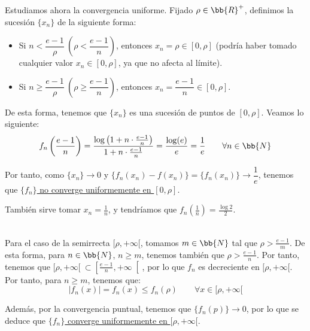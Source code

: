 \begin{ejercicio}
    Estudiamos ahora la convergencia uniforme. Fijado $\rho \in \bb{R}^+$, definimos la sucesión $\{x_n\}$ de la siguiente forma:
    \begin{itemize}
        \item Si $n < \dfrac{e-1}{\rho}~\left(\rho < \dfrac{e-1}{n}\right)$, entonces $x_n = \rho \in [0,\rho]$ (podría haber tomado cualquier valor $x_n\in [0,\rho]$, ya que no afecta al límite).
        \item Si $n \geq \dfrac{e-1}{\rho}~\left(\rho \geq \dfrac{e-1}{n}\right)$, entonces $x_n = \dfrac{e-1}{n}\in [0, \rho]$.
    \end{itemize}

    De esta forma, tenemos que $\{x_n\}$ es una sucesión de puntos de $[0,\rho]$. Veamos lo siguiente:
    \begin{equation*}
        f_n\left(\frac{e-1}{n}\right) = \frac{\log\left(1+n\cdot \frac{e-1}{n}\right)}{1+n\cdot \frac{e-1}{n}} =
        \frac{\log(e)}{e} = \frac{1}{e} \qquad \forall n\in \bb{N}
    \end{equation*}

    Por tanto, como $\{x_n\}\to 0$ y $\{f_n(x_n)-f(x_n)\}=\{f_n(x_n)\}\to \dfrac{1}{e}$, tenemos que \ul{$\{f_n\}$ no converge uniformemente en $[0,\rho]$}.
    \begin{observacion}
        También sirve tomar $x_n = \frac{1}{n}$, y tendríamos que $f_n\left(\frac{1}{n}\right) = \frac{\log 2}{2}$.
    \end{observacion}~\\

    Para el caso de la semirrecta $[\rho,+\infty[$, tomamos $m\in \bb{N}$ tal que $\rho > \frac{e-1}{m}$. De esta forma,
    para $n\in \bb{N}$, $n\geq m$, tenemos también que $\rho > \frac{e-1}{n}$. Por tanto,
    tenemos que $[\rho ,+\infty[~\subset \left[\frac{e-1}{n},+\infty\right[$,
    por lo que $f_n$ es decreciente en $[\rho,+\infty[$. Por tanto, para $n\geq m$, tenemos que:
    \begin{equation*}
        |f_n(x)| = f_n(x) \leq f_n(\rho) \qquad \forall x\in [\rho,+\infty[
    \end{equation*}

    Además, por la convergencia puntual, tenemos que $\{f_n(p)\}\to 0$, por lo que se deduce que \ul{$\{f_n\}$ converge uniformemente en $[\rho,+\infty[$}.
\end{ejercicio}



